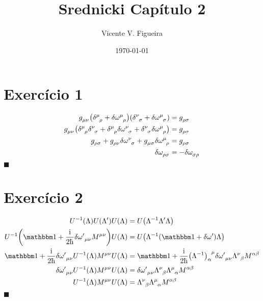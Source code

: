\documentclass[twoside]{amsart}
\title{
Srednicki Capítulo 2
}
\author{
  Vicente V. Figueira
       }
\date{\today}
\newcommand{\cqd}{\hfill$\blacksquare$}
\numberwithin{equation}{section}
\begin{document}
\maketitle

\tableofcontents


\section{Exercício 1}

\begin{align*}
    \tensor{g}{_\mu_\nu}\qty(\tensor{\delta}{^\mu_\rho}+\tensor{\delta\omega}{^\mu_\rho})\qty(\tensor{\delta}{^\nu_\sigma}+\tensor{\delta\omega}{^\mu_\sigma})&=\tensor{g}{_\rho_\sigma}\\
    \tensor{g}{_\mu_\nu}\qty(\tensor{\delta}{^\mu_\rho}\tensor{\delta}{^\nu_\sigma}+\tensor{\delta}{^\mu_\rho}\tensor{\delta\omega}{^\nu_\sigma}+\tensor{\delta}{^\nu_\sigma}\tensor{\delta\omega}{^\mu_\rho})&=\tensor{g}{_\rho_\sigma}\\
    \tensor{g}{_\rho_\sigma}+\tensor{g}{_\rho_\nu}\tensor{\delta\omega}{^\nu_\sigma}+\tensor{g}{_\mu_\sigma}\tensor{\delta\omega}{^\mu_\rho}&=\tensor{g}{_\rho_\sigma}\\
    \tensor{\delta\omega}{_\rho_\sigma}&=-\tensor{\delta\omega}{_\sigma_\rho}
\end{align*}
\cqd


\section{Exercício 2}

\begin{align*}
    U^{-1}\qty(\Lambda)U\qty(\Lambda')U\qty(\Lambda)&=U\qty(\Lambda^{-1}\Lambda'\Lambda)\\
    U^{-1}\qty(\mathbbm 1+\frac{\im}{2\hbar}\tensor{{\delta\omega'}}{_\mu_\nu}\tensor{M}{^\mu^\nu})U\qty(\Lambda)&=U\qty(\Lambda^{-1}\qty(\mathbbm 1+\delta\omega')\Lambda)\\
    \mathbbm 1+\frac{\im}{2\hbar}\tensor{{\delta\omega'}}{_\mu_\nu}U^{-1}\qty(\Lambda)\tensor{M}{^\mu^\nu}U\qty(\Lambda)&=\mathbbm 1+\frac{\im}{2\hbar}\tensor{\qty(\Lambda^{-1})}{_\alpha^\mu}\tensor{{\delta\omega'}}{_\mu_\nu}\tensor{\Lambda}{^\nu_\beta}\tensor{M}{^\alpha^\beta}\\
    \tensor{{\delta\omega'}}{_\mu_\nu}U^{-1}\qty(\Lambda)\tensor{M}{^\mu^\nu}U\qty(\Lambda)&=\tensor{{\delta\omega'}}{_\mu_\nu}\tensor{\Lambda}{^\nu_\beta}\tensor{\Lambda}{^\mu_\alpha}\tensor{M}{^\alpha^\beta}\\
    U^{-1}\qty(\Lambda)\tensor{M}{^\mu^\nu}U\qty(\Lambda)&=\tensor{\Lambda}{^\nu_\beta}\tensor{\Lambda}{^\mu_\alpha}\tensor{M}{^\alpha^\beta}
\end{align*}
\cqd
\end{document}
